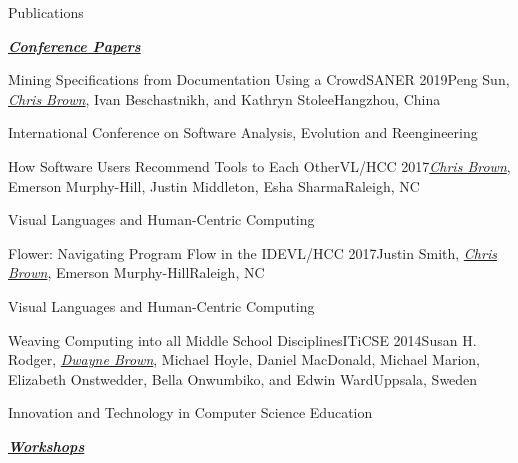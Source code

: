 \documentclass{resume} %
\begin{document}
\begin{rSection}{Publications}

\underline{\textbf{\textit{Conference Papers}}}

\begin{pSubsection}{Mining Specifications from Documentation Using a Crowd}{SANER 2019}{Peng Sun, \textit{\underline{Chris Brown}}, Ivan Beschastnikh, and Kathryn Stolee}{Hangzhou, China}
\item International Conference on Software Analysis, Evolution and Reengineering
\end{pSubsection}


\begin{pSubsection}{How Software Users Recommend Tools to Each Other}{VL/HCC 2017}{\textit{\underline{Chris Brown}}, Emerson Murphy-Hill, Justin Middleton, Esha Sharma}{Raleigh, NC}
\item Visual Languages and Human-Centric Computing
\end{pSubsection}


\begin{pSubsection}{Flower: Navigating Program Flow in the IDE}{VL/HCC 2017}{Justin Smith, \textit{\underline{Chris Brown}}, Emerson Murphy-Hill}{Raleigh, NC}
\item Visual Languages and Human-Centric Computing
\end{pSubsection}


\begin{pSubsection}{Weaving Computing into all Middle School Disciplines}{ITiCSE 2014}{Susan H. Rodger, \textit{\underline{Dwayne Brown}}, Michael Hoyle, Daniel MacDonald, Michael Marion, Elizabeth Onstwedder, Bella Onwumbiko, and Edwin Ward}{Uppsala, Sweden}
\item Innovation and Technology in Computer Science Education
\end{pSubsection}

\underline{\textbf{\textit{Workshops}}}


\end{rSection}
\end{document}
